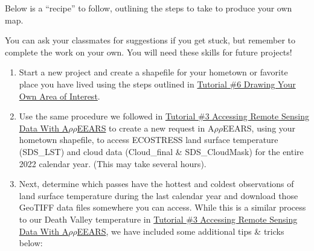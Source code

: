 \documentclass[oneside,a4paper,11pt,explicit]{book}
\begin{document}
	Below is a ``recipe'' to follow, outlining the steps to take to produce your own map. 

	\vspace{1em}

	You can ask your classmates for suggestions if you get stuck, but remember to complete the work on your own. You will need these skills for future projects!
	
	\begin{tcolorbox}[colback=yellow!5!white,colframe=IceCreamLeaf,title=\textbf{Temperature Competition Instructions}]
		\begin{enumerate}
			\item Start a new project and create a shapefile for your hometown or favorite place you have lived using the steps outlined in \href{https://jeremydforsythe.github.io/icecream-tutorials/Tutorial6_DrawingAreaOfInterest/Tutorial6_DrawingAreaOfInterest.pdf}{Tutorial \#6 Drawing Your Own Area of Interest}.
			\item Use the same procedure we followed in \href{https://jeremydforsythe.github.io/icecream-tutorials/Tutorial3_AccessingRemoteSensingDataWithAppears/Tutorial3_AccessingRemoteSensingDataWithAppears.pdf}{Tutorial \#3 Accessing Remote Sensing Data With A$\rho\rho$EEARS} to create a new request in A$\rho\rho$EEARS, using your hometown shapefile, to access ECOSTRESS land surface temperature (SDS\_LST) and cloud data (Cloud\_final \& SDS\_CloudMask)  for the entire 2022 calendar year. (This may take several hours).
			\item Next, determine which passes have the hottest and coldest observations of land surface temperature during the last calendar year and download those GeoTIFF data files somewhere you can access. While this is a similar process to our Death Valley temperature in \href{https://jeremydforsythe.github.io/icecream-tutorials/Tutorial3_AccessingRemoteSensingDataWithAppears/Tutorial3_AccessingRemoteSensingDataWithAppears.pdf}{Tutorial \#3 Accessing Remote Sensing Data With A$\rho\rho$EEARS}, we have included some additional tips \& tricks below:
		\end{enumerate}
	\end{tcolorbox} 

\end{document}
